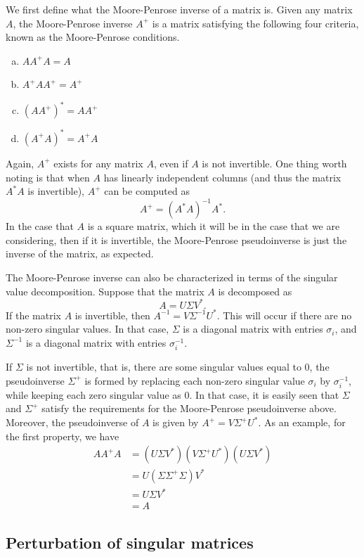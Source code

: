\documentclass{article}
\begin{document}
We first define what the Moore-Penrose inverse of a matrix is. Given any matrix
$A$, the Moore-Penrose inverse $A^+$ is a matrix satisfying the following four
criteria, known as the Moore-Penrose conditions.

\begin{enumerate}[(a)]
    \item $AA^+A=A$
    \item $A^+AA^+=A^+$
    \item $(AA^+)^*=AA^+$
    \item $(A^+A)^*=A^+A$
\end{enumerate}

Again, $A^+$ exists for any matrix $A$, even if $A$ is not invertible. One
thing worth noting is that when $A$ has linearly independent columns (and thus
the matrix $A^*A$ is invertible), $A^+$ can be computed as
\[
    A^+=(A^*A)^{-1}A^*.
\]
In the case that $A$ is a square matrix, which it will be in the case that we
are considering, then if it is invertible, the Moore-Penrose pseudoinverse is
just the inverse of the matrix, as expected.

The Moore-Penrose inverse can also be characterized in terms of the singular
value decomposition. Suppose that the matrix $A$ is decomposed as
\[
    A=U\Sigma V^*.
\]
If the matrix $A$ is invertible, then $A^{-1}=V\Sigma^{-1}U^*$. This will occur
if there are no non-zero singular values. In that case, $\Sigma$ is a diagonal
matrix with entries $\sigma_i$, and $\Sigma^{-1}$ is a diagonal matrix with
entries $\sigma_i^{-1}$.

If $\Sigma$ is not invertible, that is, there are some singular values equal to
$0$, the pseudoinverse $\Sigma^+$ is formed by replacing each non-zero singular
value $\sigma_i$ by $\sigma_i^{-1}$, while keeping each zero singular value as
$0$. In that case, it is easily seen that $\Sigma$ and $\Sigma^+$ satisfy the
requirements for the Moore-Penrose pseudoinverse above. Moreover, the
pseudoinverse of $A$ is given by $A^+=V\Sigma^+U^*$. As an example, for the
first property, we have
\begin{align*}
    AA^+A&=(U\Sigma V^*)(V\Sigma^+ U^*)(U\Sigma V^*)\\
    &=U(\Sigma\Sigma^+\Sigma)V^*\\
    &=U\Sigma V^*\\
    &=A
\end{align*}

\subsection{Perturbation of singular matrices}
\end{document}
